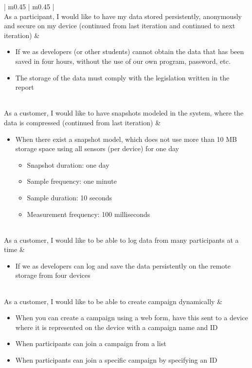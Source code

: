 \begin{center}
\begin{longtable}{| m{} | m{} |}
	 \\ \hline
	As a participant, I would like to have my data stored persistently, anonymously and secure on my device (continued from last iteration and continued to next iteration) & 
	\begin{itemize}[noitemsep,topsep=0pt,parsep=0pt,partopsep=0pt]
		\item If we as developers (or other students) cannot obtain the data that has been saved in four hours, without the use of our own program, password, etc.
		\item The storage of the data must comply with the legislation written in the report
	\end{itemize} \\ \hline
	As a customer, I would like to have snapshots modeled in the system, where the data is compressed (continued from last iteration) & 
	\begin{itemize}[noitemsep,topsep=0pt,parsep=0pt,partopsep=0pt]
	 	\item When there exist a snapshot model, which does not use more than 10 MB storage space using all sensors (per device) for one day
	 		\begin{itemize}[noitemsep,topsep=0pt,parsep=0pt,partopsep=0pt]
	 			\item Snapshot duration: one day
	 			\item Sample frequency: one minute
	 			\item Sample duration: 10 seconds
	 			\item Measurement frequency: 100 milliseconds
	 		\end{itemize}
	 \end{itemize} \\ \hline
	As a customer, I would like to be able to log data from many participants at a time & 
	\begin{itemize}[noitemsep,topsep=0pt,parsep=0pt,partopsep=0pt]
		\item If we as developers can log and save the data persistently on the remote storage from four devices
	\end{itemize} \\ \hline
	As a customer, I would like to be able to create campaign dynamically & 
	\begin{itemize}[noitemsep,topsep=0pt,parsep=0pt,partopsep=0pt]
		\item When you can create a campaign using a web form, have this sent to a device where it is represented on the device with a campaign name and ID
		\item When participants can join a campaign from a list
		\item When participants can join a specific campaign by specifying an ID
	\end{itemize} \\ \hline


\end{longtable}
\end{center}
